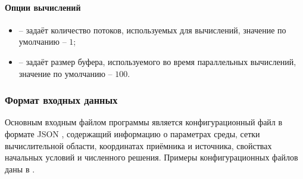 \documentclass[../document.tex]{subfiles}
\begin{document}
                \paragraph{Опции вычислений}
                    \begin{itemize}
                        \item{} -- задаёт количество потоков, используемых для вычислений, значение по умолчанию -- $1$;
                        \item{} -- задаёт размер буфера, используемого во время параллельных вычислений, значение по умолчанию -- $100$.
                    \end{itemize}
            \subsubsection{Формат входных данных}
                \par Основным входным файлом программы является конфигурационный файл в формате JSON \cite{json}, содержащий информацию о параметрах среды, сетки вычислительной области, координатах приёмника и источника, свойствах начальных условий и численного решения. Примеры конфигурационных файлов даны в .
\end{document}

